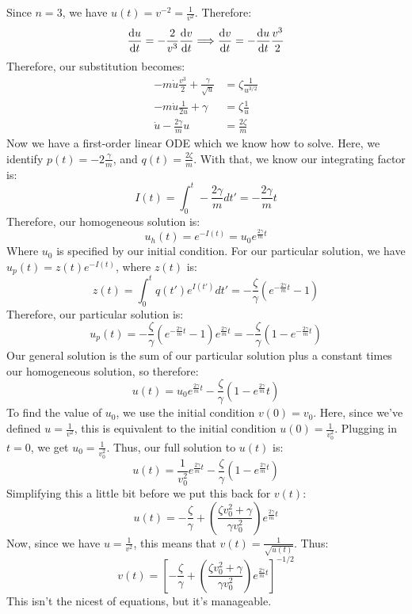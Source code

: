 \documentclass{article}
\begin{document}
\begin{solution}
	Since $n = 3$, we have $u(t) = v^{-2} = \frac{1}{v^2}$. Therefore:
	\[
		\dv{u}{t} = -\frac{2}{v^3}\dv{v}{t} \Longrightarrow \dv{v}{t} = - \dv{u}{t} \frac{v^3}{2}
	\] 
	Therefore, our substitution becomes:
	\begin{align*}
		- m \dot u \frac{v^3}{2} + \frac{\gamma}{\sqrt{u} } &= \zeta \frac{1}{u^{3 / 2}} \\
		-m \dot u \frac{1}{2u} + \gamma &= \zeta \frac{1}{u}\\
		\dot u - \frac{2\gamma}{m} u &= \frac{2\zeta}{m}
	\end{align*}
	Now we have a first-order linear ODE which we know how to solve. Here, we identify 
	$p(t) = -2 \frac{\gamma}{m}$, and $q(t) = \frac{2\zeta}{m}$. With that, we know our integrating factor is:
	\[
	I(t) = \int_0^t -\frac{2\gamma}{m} dt' = -\frac{2\gamma}{m}t
	\] 
	Therefore, our homogeneous solution is:
	\[
		u_h(t)= e^{-I(t)} = u_0e^{\frac{2\gamma}{m}t}
	\] 
	Where $u_0$ is specified by our initial condition. For our particular solution, we have $u_p(t) = 
	z(t) e^{-I(t)}$, where $z(t)$ is:
	\[
		z(t) = \int_0^t q(t') e^{I(t')} dt' = -\frac{\zeta}{\gamma}\left( e^{- \frac{2\gamma}{m}t} - 1\right) 
	\] 
	Therefore, our particular solution is:
	\[
		u_p(t) = -\frac{\zeta}{\gamma}\left( e^{-\frac{2\gamma}{m}t} - 1\right) e^{\frac{2\gamma}{m}t} = 
		-\frac{\zeta}{\gamma}\left( 1 - e^{-\frac{2\gamma}{m}t} \right) 
	\] 
	Our general solution is the sum of our particular solution plus a constant times our homogeneous solution, 
	so therefore:
	\[
		u(t) = u_0e^{\frac{2\gamma}{m}t} - \frac{\zeta}{\gamma}\left( 1 - e^{\frac{2\gamma}{m}}t \right) 
	\] 
	To find the value of $u_0$, we use the initial condition $v(0) = v_0$. Here, since we've defined 
	$u = \frac{1}{v^2}$, this is equivalent to the initial condition $u(0) = \frac{1}{v_0^2}$. Plugging in 
	$t = 0$, we get $u_0 = \frac{1}{v_0^2}$. Thus, our full solution to $u(t)$ is:
	\[
		u(t) = \frac{1}{v_0^2}e^{\frac{2\gamma}{m}t} - \frac{\zeta}{\gamma}\left(1 -
		e^{\frac{2\gamma}{m}t}\right)
	\] 
	Simplifying this a little bit before we put this back for $v(t)$:
	\[
		u(t) = -\frac{\zeta}{\gamma}+ \left( \frac{\zeta v_0^2 + \gamma}{\gamma v_0^2} \right)
		e^{\frac{2\gamma}{m}t}
	\] 
	Now, since we have $u = \frac{1}{v^2}$, this means that $v(t) = \frac{1}{\sqrt{u(t)} }$. Thus:
	\[
	v(t) = \left[-\frac{\zeta}{\gamma}+ \left( \frac{\zeta v_0^2 + \gamma}{\gamma v_0^2} \right)
	e^{\frac{2\gamma}{m}t}\right]^{- 1 / 2}
	\] 
	This isn't the nicest of equations, but it's manageable.
\end{solution}
\end{document}
